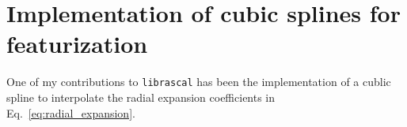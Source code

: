 \section{Implementation of cubic splines for featurization}
\label{sec:cubic_spline}
One of my contributions to \texttt{librascal} has been the implementation of a cublic spline to interpolate the radial expansion coefficients in Eq.~\ref{eq:radial_expansion}.
